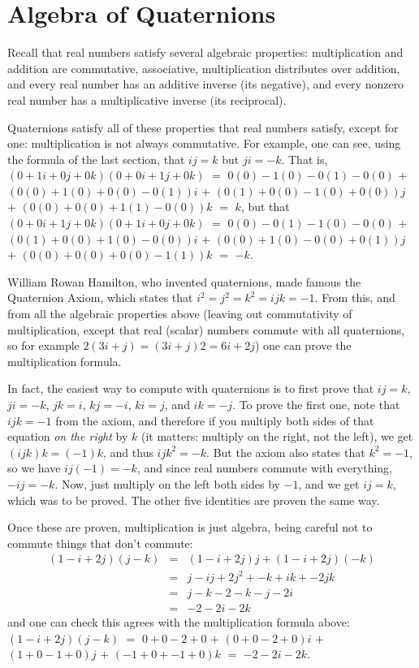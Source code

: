 \documentclass[letter,12pt]{article}
\begin{document}
\section{Algebra of Quaternions}

Recall that real numbers satisfy several algebraic properties: multiplication and addition are commutative, associative, multiplication distributes over addition, and every real number has an additive inverse (its negative), and every nonzero real number has a multiplicative inverse (its reciprocal).

Quaternions satisfy all of these properties that real numbers satisfy, except for one: multiplication is not always commutative.  For example, one can see, using the formula of the last section, that $ij = k$ but $ji = -k$.  That is, $(0+1i+0j+0k)(0+0i+1j+0k)$ $=$ $0(0) - 1(0) - 0(1) - 0(0)$ $+$ $(0(0) +1(0) + 0(0) - 0(1))i$ $+$ $(0(1) + 0(0) - 1(0) + 0(0))j$  $+$ $(0(0) + 0(0) + 1(1) - 0(0))k$ $=$ $k$, but that $(0+0i+1j+0k)(0+1i+0j+0k)$ $=$  $0(0) - 0(1) - 1(0) - 0(0)$ $+$ $(0(1) +0(0) + 1(0) - 0(0))i$ $+$ $(0(0) + 1(0) - 0(0) + 0(1))j$  $+$ $(0(0) + 0(0) + 0(0) -1(1))k$ $=$ $-k$.

William Rowan Hamilton, who invented quaternions, made famous the Quaternion Axiom, which states that $i^2=j^2=k^2=ijk=-1$.  From this, and from all the algebraic properties above (leaving out commutativity of multiplication, except that real (scalar) numbers commute with all quaternions, so for example $2(3i+j)=(3i+j)2 = 6i+2j$)  one can prove the multiplication formula.

In fact, the easiest way to compute with quaternions is to first prove that $ij=k$, $ji=-k$, $jk=i$, $kj=-i$, $ki=j$, and $ik=-j$.  To prove the first one, note that $ijk=-1$ from the axiom, and therefore if you multiply both sides of that equation \emph{on the right} by $k$ (it matters: multiply on the right, not the left), we get $(ijk)k = (-1)k$, and thus $ijk^2=-k$.  But the axiom also states that $k^2=-1$, so we have $ij(-1)=-k$, and since real numbers commute with everything, $-ij=-k$.  Now, just multiply on the left both sides by $-1$, and we get $ij=k$, which was to be proved.  The other five identities are  proven the same way.

Once these are proven, multiplication is just algebra, being careful not to commute things that don’t commute:
\begin{eqnarray*}
(1 - i + 2j)(j - k)&=&(1-i+2j)j + (1-i+2j)(-k)\\
&=&j - ij + 2j^2 + -k + ik + -2jk\\
&=&j - k - 2 - k - j -2i\\
&=&-2-2i-2k
\end{eqnarray*}
and one can check this agrees with the multiplication formula above: $(1 - i + 2j)(j - k)$ $=$ $0 + 0 - 2 + 0$ $+$ 
$(0 + 0 - 2 + 0)i$ $+$ $(1 + 0 - 1 + 0)j$ $+$ $(-1 + 0 + -1 + 0)k$ $=$ $-2-2i-2k$.
\end{document}
